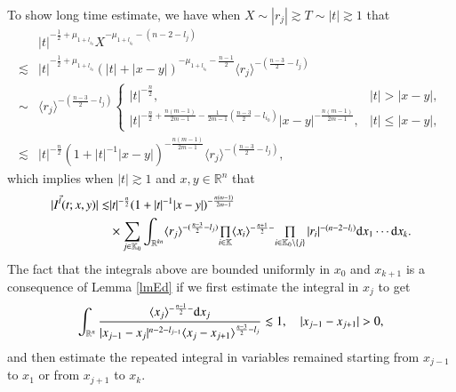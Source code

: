 \documentclass[11pt,reqno]{amsart}
\def\d{{\rm d}}
\numberwithin{equation}{section}
\theoremstyle{definition}
\begin{document}
To show long time estimate, we have when $X\sim|r_j|\gtrsim T\sim|t|\gtrsim1$ that
\begin{equation}\label{cal1}
	\begin{split}
		&|t|^{-\frac12+\mu_{1+l_{i_0}}}X^{-\mu_{1+l_{i_0}}-(n-2-l_j)}\\
		\lesssim&|t|^{-\frac12+\mu_{1+l_{i_0}}}(|t|+|x-y|)^{-\mu_{1+l_{i_0}}-\frac{n-1}{2}}\langle r_j\rangle^{-(\frac{n-3}{2}-l_j)}\\
		\sim&\langle r_j\rangle^{-(\frac{n-3}{2}-l_j)}\begin{cases}
			|t|^{-\frac n2},\quad&|t|>|x-y|,\\
			|t|^{-\frac n2+\frac{n(m-1)}{2m-1}-\frac{1}{2m-1}(\frac{n-3}{2}-l_{i_0})}|x-y|^{-\frac{n(m-1)}{2m-1}},&|t|\leq|x-y|,
		\end{cases}\\
		\lesssim&|t|^{-\frac n2}(1+|t|^{-1}|x-y|)^{-\frac{n(m-1)}{2m-1}}\langle r_j\rangle^{-(\frac{n-3}{2}-l_j)},
	\end{split}
\end{equation}
which implies when $|t|\gtrsim1$ and $x,y\in\mathbb{R}^n$ that
\begin{equation*}
	\begin{split}
		|I^{\vec{l}}(t;x,y)|\lesssim&|t|^{-\frac n2}(1+|t|^{-1}|x-y|)^{-\frac{n(m-1)}{2m-1}}\\
		&\times\sum_{j\in\mathbb{K}_0}\int_{\mathbb{R}^{kn}}\langle r_j\rangle^{-(\frac{n-3}{2}-l_j)}\mbox{$\prod\limits_{i\in\mathbb{K}}\langle x_i\rangle^{-\frac{n+1}{2}-}$}\mbox{$\prod\limits_{i\in\mathbb{K}_0\setminus\{j\}}|r_i|^{-(n-2-l_i)}$}\d x_1\cdots \d x_k.
	\end{split}
\end{equation*}
The fact that the integrals above are bounded uniformly in $x_0$ and $x_{k+1}$ is a consequence of Lemma \ref{lmEd} if we first estimate the integral in $x_j$ to get
\begin{equation*}\label{intxj}
	\int_{\mathbb{R}^n}\frac{\langle x_j\rangle^{-\frac{n-1}{2}-}\d x_j}{|x_{j-1}-x_j|^{n-2-l_{j-1}}\langle x_j-x_{j+1}\rangle^{\frac{n-3}{2}-l_j}}\lesssim1,\quad|x_{j-1}-x_{j+1}|>0,
\end{equation*}
and then estimate the repeated integral in variables remained starting from $x_{j-1}$ to $x_1$ or from $x_{j+1}$ to $x_k$.
\end{document}
